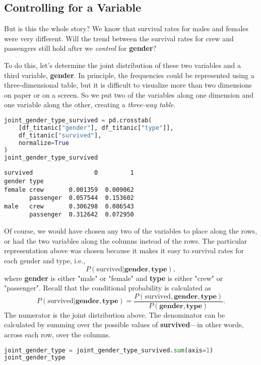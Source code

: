 \subsection{Controlling for a Variable}\label{2.3.2}

But is this the whole story? We know that survival rates for males and females were very different. Will the trend between the survival rates for crew and passengers still hold after we \textit{control} for \textbf{gender}?

To do this, let's determine the joint distribution of these two variables and a third variable, \textbf{gender}. In principle, the frequencies could be represented using a three-dimensional table, but it is difficult to visualize more than two dimensions on paper or on a screen. So we put two of the variables along one dimension and one variable along the other, creating a \textit{three-way table}.

\begin{lstlisting}[language=Python]
joint_gender_type_survived = pd.crosstab(
    [df_titanic["gender"], df_titanic["type"]],
    df_titanic["survived"],
    normalize=True
)
joint_gender_type_survived
\end{lstlisting}

\small\begin{verbatim}
survived                 0         1
gender type                         
female crew       0.001359  0.009062
       passenger  0.057544  0.153602
male   crew       0.306298  0.086543
       passenger  0.312642  0.072950
\end{verbatim}



Of course, we would have chosen any two of the variables to place along the rows, or had the two variables along the columns instead of the rows. The particular representation above was chosen because it makes it easy to survival rates for each gender and type, i.e.,
$$ P(\text{survived} | \textbf{gender}, \textbf{type}), $$
where \textbf{gender} is either "male" or "female" and \textbf{type} is either "crew" or "passenger". Recall that the conditional probability is calculated as
$$ P(\text{survived} | \textbf{gender}, \textbf{type}) = \frac{P(\text{survived}, \textbf{gender}, \textbf{type})}{P(\textbf{gender}, \textbf{type})}. $$
The numerator is the joint distribution above. The denominator can be calculated by summing over the possible values of \textbf{survived}---in other words, across each row, over the columns.

\begin{lstlisting}[language=Python]
joint_gender_type = joint_gender_type_survived.sum(axis=1)
joint_gender_type
\end{lstlisting}

